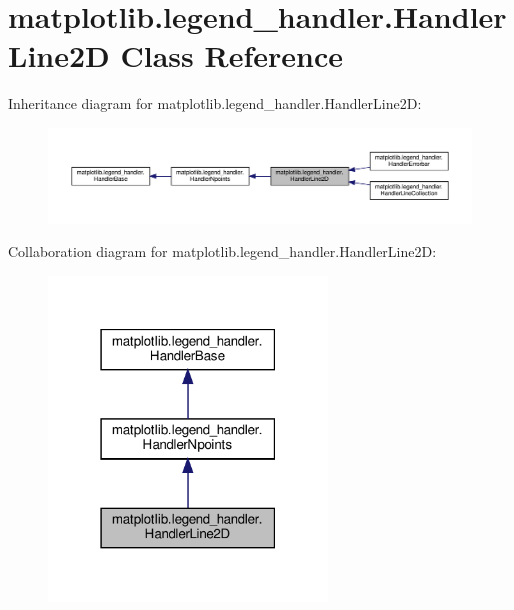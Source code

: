 \hypertarget{classmatplotlib_1_1legend__handler_1_1HandlerLine2D}{}\section{matplotlib.\+legend\+\_\+handler.\+Handler\+Line2D Class Reference}
\label{classmatplotlib_1_1legend__handler_1_1HandlerLine2D}


Inheritance diagram for matplotlib.\+legend\+\_\+handler.\+Handler\+Line2D\+:
\nopagebreak
\begin{figure}[H]
\begin{center}
\leavevmode
\includegraphics[width=350pt]{classmatplotlib_1_1legend__handler_1_1HandlerLine2D__inherit__graph}
\end{center}
\end{figure}


Collaboration diagram for matplotlib.\+legend\+\_\+handler.\+Handler\+Line2D\+:
\nopagebreak
\begin{figure}[H]
\begin{center}
\leavevmode
\includegraphics[width=210pt]{classmatplotlib_1_1legend__handler_1_1HandlerLine2D__coll__graph}
\end{center}
\end{figure}
